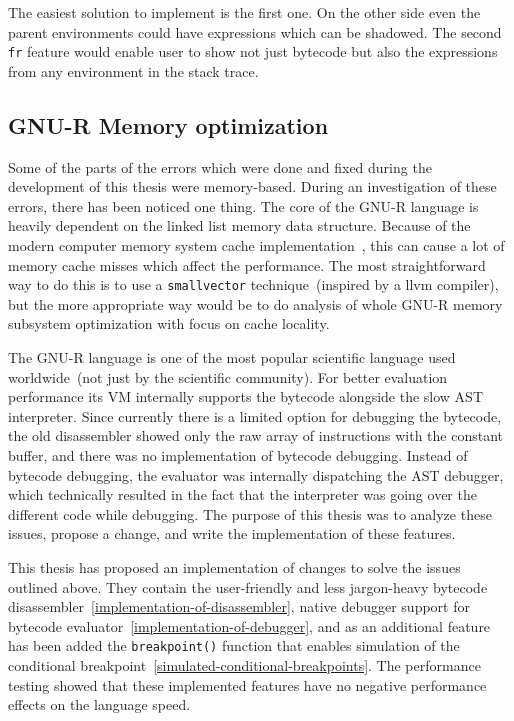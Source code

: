 \documentclass[thesis=M,english]{FITthesis}[2018/10/20]
\newcommand{\code}[1]{\texttt{#1}}
\begin{document}
{The easiest solution to implement is the first one. On the other side even the parent environments could have expressions which can be shadowed. The second \code{fr} feature would enable user to show not just bytecode but also the expressions from any environment in the stack trace.

\subsection{GNU-R Memory optimization}

Some of the parts of the errors which were done and fixed during the development of this thesis were memory-based. During an investigation of these errors, there has been noticed one thing. The core of the GNU-R language is heavily dependent on the linked list memory data structure. Because of the modern computer memory system cache implementation~\cite{processor-cache}, this can cause a lot of memory cache misses which affect the performance. The most straightforward way to do this is to use a \code{smallvector} technique~(inspired by a llvm compiler), but the more appropriate way would be to do analysis of whole GNU-R memory subsystem optimization with focus on cache locality.

\begin{conclusion}\label{conclusion}

The GNU-R language is one of the most popular scientific language used worldwide~(not just by the scientific community). For better evaluation performance its VM internally supports the bytecode alongside the slow AST interpreter. Since currently there is a limited option for debugging the bytecode, the old disassembler showed only the raw array of instructions with the constant buffer, and there was no implementation of bytecode debugging. Instead of bytecode debugging, the evaluator was internally dispatching the AST debugger, which technically resulted in the fact that the interpreter was going over the different code while debugging. The purpose of this thesis was to analyze these issues, propose a change, and write the implementation of these features.

This thesis has proposed an implementation of changes to solve the issues outlined above. They contain the user-friendly and less jargon-heavy bytecode disassembler~\ref{implementation-of-disassembler}, native debugger support for bytecode evaluator~\ref{implementation-of-debugger}, and as an additional feature has been added the \code{breakpoint()} function that enables simulation of the conditional breakpoint~\ref{simulated-conditional-breakpoints}. The performance testing showed that these implemented features have no negative performance effects on the language speed.


\end{conclusion}}
\end{document}
